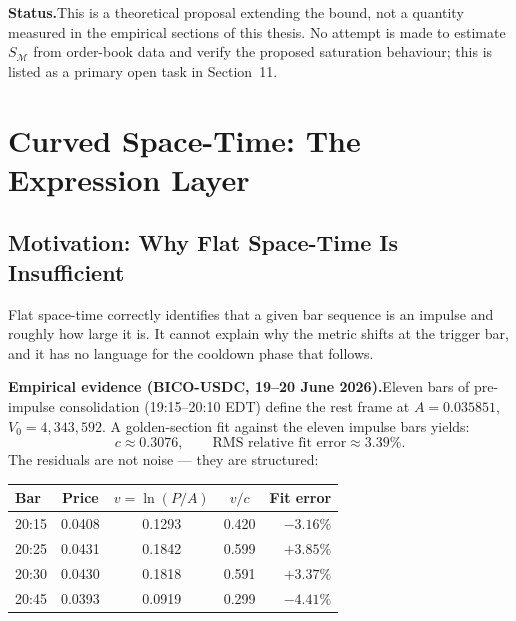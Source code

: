 \documentclass[12pt,a4paper]{article}
\begin{document}
\textbf{Status.}\quad This is a theoretical proposal extending the bound,
not a quantity measured in the empirical sections of this thesis.
No attempt is made to estimate $S_{\mathcal{M}}$ from order-book data
and verify the proposed saturation behaviour; this is listed as a
primary open task in Section~11.


\section{Curved Space-Time: The Expression Layer}
\label{sec:curved}

\subsection{Motivation: Why Flat Space-Time Is Insufficient}

Flat space-time correctly identifies that a given bar sequence is an
impulse and roughly how large it is. It cannot explain why the metric
shifts at the trigger bar, and it has no language for the cooldown phase
that follows.

\textbf{Empirical evidence (BICO-USDC, 19--20 June 2026).}\quad Eleven
bars of pre-impulse consolidation (19:15--20:10 EDT) define the rest
frame at $A=0.035851$, $V_0=4{,}343{,}592$. A golden-section fit against
the eleven impulse bars yields:
\begin{equation}
    c \approx 0.3076, \qquad \text{RMS relative fit error} \approx 3.39\%.
\end{equation}
The residuals are not noise --- they are structured:

\begin{center}
\begin{tabular}{lcccr}
\toprule
Bar & Price & $v=\ln(P/A)$ & $v/c$ & Fit error \\
\midrule
20:15 & 0.0408 & 0.1293 & 0.420 & $-3.16\%$ \\
20:25 & 0.0431 & 0.1842 & 0.599 & $+3.85\%$ \\
20:30 & 0.0430 & 0.1818 & 0.591 & $+3.37\%$ \\
20:45 & 0.0393 & 0.0919 & 0.299 & $-4.41\%$ \\
\bottomrule
\end{tabular}
\end{center}
\end{document}
